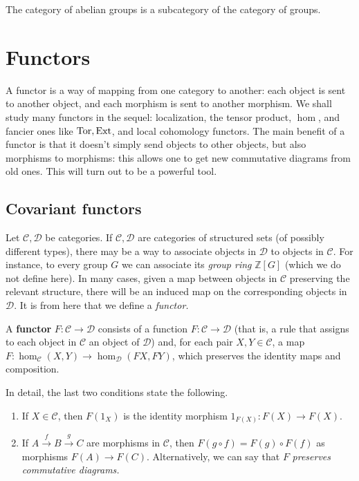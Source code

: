 \begin{example} 
The category of abelian groups is a subcategory of the category of groups.
\end{example} 

\section{Functors}

A functor is a way of mapping from one category to another: each object is sent
to another object, and each morphism is sent to another morphism. We shall
study many functors in the sequel: localization, the tensor product, $\hom$,
and fancier ones like $\operatorname{Tor}, \operatorname{Ext}$, and local cohomology functors.
The main benefit of a functor is that it doesn't simply send objects to
other objects, but also morphisms to morphisms: this allows one to get new commutative
diagrams from old ones.
This will turn out to be a powerful tool.


\subsection{Covariant functors}
Let $\mathcal{C}, \mathcal{D}$ be categories. If $\mathcal{C}, \mathcal{D}$
are categories of structured sets (of possibly different types), there may be a
way to associate objects in $\mathcal{D}$ to objects in $\mathcal{C}$. For
instance, to every group $G$ we can associate its \emph{group ring}
$\mathbb{Z}[G]$
 (which we do not define here).
In many cases, given a map between objects in $\mathcal{C}$ preserving the
relevant structure, there will be an induced map on the corresponding objects
in $\mathcal{D}$. It is from here that we define a \emph{functor.}

\begin{definition} \label{covfunc}
A \textbf{functor} $F: \mathcal{C} \to \mathcal{D}$ consists of a function $F:
\mathcal{C} \to  \mathcal{D}$ (that is, a rule that assigns to each object
in $\mathcal{C}$ an object of $\mathcal{D}$) and, for each pair $X, Y \in
\mathcal{C}$,
a map
$F: \hom_{\mathcal{C}}(X, Y) \to \hom_{\mathcal{D}}(FX, FY)$, which preserves
the identity
maps and composition.

In detail, the last two conditions state the following. 
\begin{enumerate}
\item  If $X \in
\mathcal{C}$, then $F(1_X)$ is the identity morphism $1_{F(X)}: F(X) \to
F(X)$.
\item  If $A \stackrel{f}{\to} B \stackrel{g}{\to} C$ are
morphisms in $\mathcal{C}$,
then $F(g \circ f) = F(g) \circ F(f)$ as morphisms $F(A) \to F(C)$.
Alternatively, we can say that $F$ \emph{preserves commutative diagrams.}
\end{enumerate}
\end{definition}

